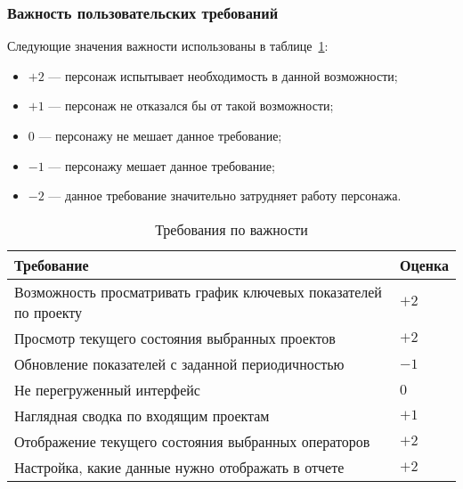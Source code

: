 \subsubsection{Важность пользовательских требований}

Следующие значения важности использованы в таблице~\ref{tab:req:importance}:
\begin{itemize}
    \item $+2$ --- персонаж испытывает необходимость в данной возможности;
    \item $+1$ --- персонаж не отказался бы от такой возможности;
    \item $0$ --- персонажу не мешает данное требование;
    \item $-1$ --- персонажу мешает данное требование;
    \item $-2$ --- данное требование значительно затрудняет работу персонажа.
\end{itemize}

\begin{table}[ht]
    \caption{Требования по важности}
    \begin{small}
        \begin{tabular}{|p{}|p{}|}
            \hline
            Требование                          & Оценка \\
            \hline
            Возможность просматривать график ключевых показателей по проекту & $+2$  \\
            \hline
            Просмотр текущего состояния выбранных проектов           & $+2$    \\
            \hline
            Обновление показателей с заданной периодичностью               & $-1$ \\
            \hline
            Не перегруженный интерфейс               & $0$ \\
            \hline
            Наглядная сводка по входящим проектам               & $+1$ \\
            \hline
            Отображение текущего состояния выбранных операторов & $+2$ \\
            \hline
            Настройка, какие данные нужно отображать в отчете               & $+2$ \\
            \hline
        \end{tabular}
    \end{small}
    \label{tab:req:importance}
\end{table}

